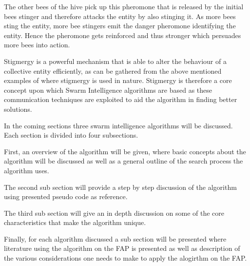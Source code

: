 The other bees of the hive pick up this pheromone that is released by the initial bees stinger and therefore attacks the entity by also stinging it\cite{stigmergicoptimization}. As more bees sting the entity, more bee stingers emit the danger pheromone identifying the entity\cite{stigmergicoptimization}. Hence the pheromone gets reinforced and thus stronger which persuades more bees into action\cite{stigmergicoptimization}.

Stigmergy is a powerful mechanism that is able to alter the behaviour of a collective entity efficiently, as can be gathered from the above mentioned examples of where stigmergy is used in nature\cite{AntsAndStigmergy,CompuIntelligenceIntro,AntIntroTrends}. Stigmergy is therefore a core concept upon which Swarm Intelligence algorithms are based as these communication techniques are exploited to aid the algorithm in finding better solutions\cite{AntsAndStigmergy,CompuIntelligenceIntro,AntIntroTrends}.

In the coming sections three swarm intelligence algorithms will be discussed. Each section is divided into four subsections. 

First, an overview of the algorithm will be given, where basic concepts about the algorithm will be discussed as well as a general outline of the search process the algorithm uses. 

The second sub section will provide a step by step discussion of the algorithm using presented pseudo code as reference.

The third sub section will give an in depth discussion on some of the core characteristics that make the algorithm unique. 

Finally, for each algorithm discussed a sub section will be presented where literature using the algorithm on the FAP is presented as well as description of the various considerations one needs to make to apply the alogirthm on the FAP.

